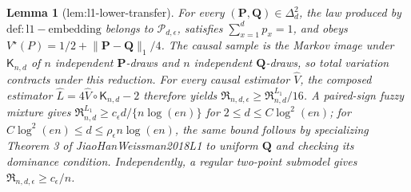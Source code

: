 \documentclass{article}
\newtheorem{lemma}{Lemma}
\begin{document}
\begin{lemma}[lem:l1-lower-transfer]\label{lem:l1-lower-transfer}
For every \((\mathbf P,\mathbf Q)\in\Delta_d^2\), the law produced by \(\mathrm{def:l1-embedding}\) belongs to \(\mathcal P_{d,\epsilon}\), satisfies \(\sum_{x=1}^dp_x=1\), and obeys \(V^\star(P)=1/2+\lVert\mathbf P-\mathbf Q\rVert_1/4\). The causal sample is the Markov image under \(\mathsf K_{n,d}\) of \(n\) independent \(\mathbf P\)-draws and \(n\) independent \(\mathbf Q\)-draws, so total variation contracts under this reduction. For every causal estimator \(\widehat V\), the composed estimator \(\widehat L=4\widehat V\circ\mathsf K_{n,d}-2\) therefore yields \(\mathfrak R_{n,d,\epsilon}\ge\mathfrak R^{L_1}_{n,d}/16\). A paired-sign fuzzy mixture gives \(\mathfrak R^{L_1}_{n,d}\ge c_\epsilon d/\{n\log(en)\}\) for \(2\le d\le C\log^2(en)\); for \(C\log^2(en)\le d\le\rho_\epsilon n\log(en)\), the same bound follows by specializing Theorem 3 of JiaoHanWeissman2018L1 to uniform \(\mathbf Q\) and checking its dominance condition. Independently, a regular two-point submodel gives \(\mathfrak R_{n,d,\epsilon}\ge c_\epsilon/n\).
\end{lemma}
\end{document}
